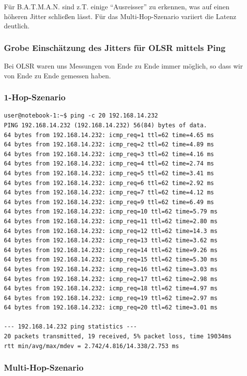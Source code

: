 \documentclass[a4paper,10pt]{article}
\begin{document}
Für B.A.T.M.A.N. sind z.T. einige "`Ausreisser"' zu erkennen, was auf einen höheren Jitter schließen lässt.
Für das Multi-Hop-Szenario variiert die Latenz deutlich.

\subsubsection{Grobe Einschätzung des Jitters für OLSR mittels Ping}

Bei OLSR waren uns Messungen von Ende zu Ende immer möglich, so dass wir von Ende zu Ende gemessen haben.

\subsubsection*{1-Hop-Szenario}

\begin{lstlisting}
user@notebook-1:~$ ping -c 20 192.168.14.232
PING 192.168.14.232 (192.168.14.232) 56(84) bytes of data.
64 bytes from 192.168.14.232: icmp_req=1 ttl=62 time=4.65 ms
64 bytes from 192.168.14.232: icmp_req=2 ttl=62 time=4.89 ms
64 bytes from 192.168.14.232: icmp_req=3 ttl=62 time=4.16 ms
64 bytes from 192.168.14.232: icmp_req=4 ttl=62 time=2.74 ms
64 bytes from 192.168.14.232: icmp_req=5 ttl=62 time=3.41 ms
64 bytes from 192.168.14.232: icmp_req=6 ttl=62 time=2.92 ms
64 bytes from 192.168.14.232: icmp_req=7 ttl=62 time=4.12 ms
64 bytes from 192.168.14.232: icmp_req=9 ttl=62 time=6.49 ms
64 bytes from 192.168.14.232: icmp_req=10 ttl=62 time=5.79 ms
64 bytes from 192.168.14.232: icmp_req=11 ttl=62 time=2.80 ms
64 bytes from 192.168.14.232: icmp_req=12 ttl=62 time=14.3 ms
64 bytes from 192.168.14.232: icmp_req=13 ttl=62 time=3.62 ms
64 bytes from 192.168.14.232: icmp_req=14 ttl=62 time=9.26 ms
64 bytes from 192.168.14.232: icmp_req=15 ttl=62 time=5.30 ms
64 bytes from 192.168.14.232: icmp_req=16 ttl=62 time=3.03 ms
64 bytes from 192.168.14.232: icmp_req=17 ttl=62 time=2.98 ms
64 bytes from 192.168.14.232: icmp_req=18 ttl=62 time=4.97 ms
64 bytes from 192.168.14.232: icmp_req=19 ttl=62 time=2.97 ms
64 bytes from 192.168.14.232: icmp_req=20 ttl=62 time=3.01 ms

--- 192.168.14.232 ping statistics ---
20 packets transmitted, 19 received, 5% packet loss, time 19034ms
rtt min/avg/max/mdev = 2.742/4.816/14.338/2.753 ms
\end{lstlisting}

\subsubsection*{Multi-Hop-Szenario}
\end{document}
